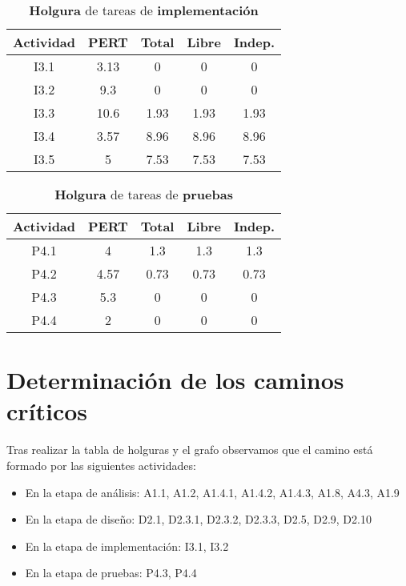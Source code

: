 \documentclass[11pt,a4paper,spanish,twoside]{report}
\begin{document}
\begin{table}[!h]
\centering
  \begin{tabular}{|c||c||c|c|c|}
    \hline
     \textbf{Actividad} & \textbf{PERT} & \textbf{Total} & \textbf{Libre}
    & \textbf{Indep.}\\
    \hline \hline
    I3.1 & 3.13 & 0 & 0 & 0\\
    \hline
    I3.2 & 9.3 & 0 & 0 & 0\\
    \hline
    I3.3 & 10.6 & 1.93 & 1.93 & 1.93\\
    \hline
    I3.4 & 3.57 & 8.96 & 8.96 & 8.96\\
    \hline
    I3.5 & 5 & 7.53 & 7.53 & 7.53\\
    \hline
  \end{tabular}
  \caption{\textbf{Holgura} de tareas de \textbf{implementación}}
  \label{Tab:HOLimp}
\end{table}

\begin{table}[!h]
\centering
  \begin{tabular}{|c||c||c|c|c|}
    \hline
     \textbf{Actividad} & \textbf{PERT} & \textbf{Total} & \textbf{Libre}
    & \textbf{Indep.}\\
    \hline \hline
    P4.1 & 4 & 1.3 & 1.3 & 1.3\\
    \hline
    P4.2 & 4.57 & 0.73 & 0.73 & 0.73\\
    \hline
    P4.3 & 5.3 & 0 & 0 & 0\\
    \hline
    P4.4 & 2 & 0 & 0 & 0\\
    \hline
  \end{tabular}
  \caption{\textbf{Holgura} de tareas de \textbf{pruebas}}
  \label{Tab:HOLpru}
\end{table}

\section{Determinación de los caminos críticos}
Tras realizar la tabla de holguras y el grafo observamos que el camino está
formado por las siguientes actividades:
\begin{itemize}
\item En la etapa de análisis: A1.1, A1.2, A1.4.1, A1.4.2, A1.4.3, A1.8,
  A4.3, A1.9 
\item En la etapa de diseño: D2.1, D2.3.1, D2.3.2, D2.3.3, D2.5, D2.9, D2.10 
\item En la etapa de implementación: I3.1, I3.2
\item En la etapa de pruebas: P4.3, P4.4
\end{itemize}
\end{document}

